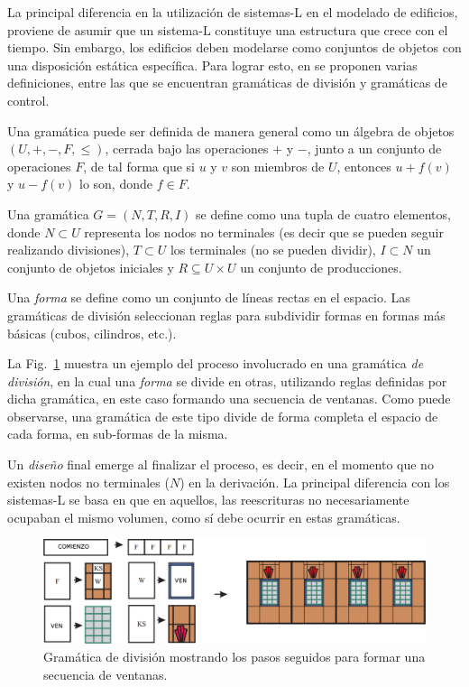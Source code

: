 La principal diferencia en la utilización de sistemas-L en el modelado de edificios, proviene de asumir que un sistema-L constituye una estructura que crece con el tiempo.
Sin embargo, los edificios deben modelarse como conjuntos de objetos con una disposición estática específica.
Para lograr esto, en \cite{Wonka2003} se proponen varias definiciones, entre las que se encuentran gramáticas de división y gramáticas de control.

Una gramática puede ser definida de manera general como un álgebra de objetos $(U,+,-,F,\leq)$, cerrada bajo las operaciones $+$ y $-$, junto a un conjunto de operaciones $F$, de tal forma que si $u$ y $v$ son miembros de $U$, entonces $u+f(v)$ y $u-f(v)$ lo son, donde $f \in F$.

Una gramática $G=(N,T,R,I)$ se define como una tupla de cuatro elementos, donde $N \subset U$ representa los nodos no terminales (es decir que se pueden seguir realizando divisiones), $T \subset U$ los terminales (no se pueden dividir), $I \subset N$ un conjunto de objetos iniciales y $R \subseteq U \times U$ un conjunto de producciones.



Una {\em forma} se define como un conjunto de líneas rectas en el espacio.
Las gramáticas de división seleccionan reglas para subdividir formas en formas más básicas (cubos, cilindros, etc.).

La Fig.~\ref{fg:splitgrammar} muestra un ejemplo del proceso involucrado en una gramática {\em de división}, en la cual una {\em forma} se divide en otras, utilizando reglas definidas por dicha gramática, en este caso formando una secuencia de ventanas.
Como puede observarse, una gramática de este tipo divide de forma completa el espacio de cada forma, en sub-formas de la misma.

Un {\em diseño} final emerge al finalizar el proceso, es decir, en el momento que no existen nodos no terminales ($N$) en la derivación.
La principal diferencia con los sistemas-L se basa en que en aquellos, las reescrituras no necesariamente ocupaban el mismo volumen, como sí debe ocurrir en estas gramáticas.

\begin{figure}
\center
\includegraphics[width=13cm]{figures/splitgrammar}
\caption[Gramática para formar una secuencia de ventanas]{Gramática de división mostrando los pasos seguidos para formar una secuencia de ventanas.}
\label{fg:splitgrammar}
\end{figure}

